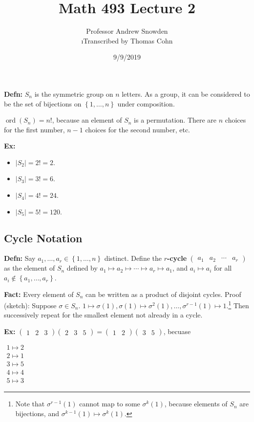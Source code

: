 \documentclass[10pt,letterpaper]{article}
\author{Professor Andrew Snowden\\ \small\i{Transcribed by Thomas Cohn}}
\title{Math 493 Lecture 2}
\date{9/9/2019} %
\newcommand{\n}{\hfill\break}
\newcommand{\hangblock}[2]{\par\noindent\settowidth{\hangindent}{\textbf{#1: }}\textbf{#1: }\!\!\!#2}
\newcommand{\defn}[1]{\hangblock{Defn}{#1}}
\newcommand{\ex}[1]{\hangblock{Ex}{#1}}
\newcommand{\inlineeq}[1]{\centerline{$\displaystyle #1$}}
\newcommand{\card}[1]{\left|#1\right|}
\newcommand{\set}[1]{\left\{#1\right\}}
\DeclareMathOperator{\ord}{ord}
\newcommand{\cycle}[1]{\begin{pmatrix}#1\end{pmatrix}}
\begin{document}
\maketitle
\setlength\RaggedRightParindent{\parindent}
\RaggedRight

\defn{
	$S_{n}$ is the symmetric group on $n$ letters. As a group, it can be considered to be the set of bijections on $\set{1,\ldots,n}$ under composition.
}

\par\noindent
$\ord(S_{n})=n!$, because an element of $S_{n}$ is a permutation. There are $n$ choices for the first number, $n-1$ choices for the second number, etc.\n

\ex{
	\begin{itemize}
		\item $\card{S_{2}}=2!=2$.
		\item $\card{S_{3}}=3!=6$.
		\item $\card{S_{4}}=4!=24$.
		\item $\card{S_{5}}=5!=120$.
	\end{itemize}
}

\subsection*{Cycle Notation}

\defn{
	Say $a_{1},\ldots,a_{r}\in\set{1,\ldots,n}$ distinct. Define the \textbf{$r$-cycle} $\cycle{a_{1} & a_{2} & \cdots & a_{r}}$ as the element of $S_{n}$ defined by $a_{1}\mapsto{}a_{2}\mapsto\cdots\mapsto{}a_{r}\mapsto{}a_{1}$, and $a_{i}\mapsto{}a_{i}$ for all $a_{i}\not\in\set{a_{1},\ldots,a_{r}}$.\n
}

\hangblock{Fact}{
	Every element of $S_{n}$ can be written as a product of disjoint cycles.\n
	Proof (sketch): Suppose $\sigma\in{}S_{n}$. $1\mapsto\sigma(1),\sigma(1)\mapsto\sigma^{2}(1),\ldots,\sigma^{r-1}(1)\mapsto{}1$.\footnote{Note that $\sigma^{r-1}(1)$ cannot map to some $\sigma^{k}(1)$, because elements of $S_{n}$ are bijections, and $\sigma^{k-1}(1)\mapsto\sigma^{k}(1)$.} Then successively repeat for the smallest element not already in a cycle.\n
}

\ex{
	$\cycle{1 & 2 & 3}\cycle{2 & 3 & 5}=\cycle{1 & 2}\cycle{3 & 5}$, becuase\n
	\inlineeq{
		\begin{array}{l}
			1\mapsto{}2\\
			2\mapsto{}1\\
			3\mapsto{}5\\
			4\mapsto{}4\\
			5\mapsto{}3
		\end{array}
	}
}
\end{document}
